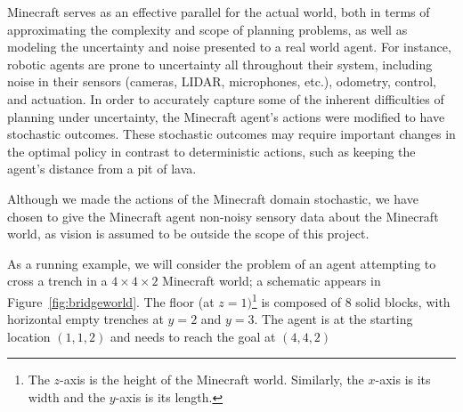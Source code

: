 \documentclass[]{article}
\begin{document}
Minecraft serves as an effective parallel for the actual world, both
in terms of approximating the complexity and scope of planning
problems, as well as modeling the uncertainty and noise presented to a
real world agent.  For instance, robotic agents are prone to
uncertainty all throughout their system, including noise in their
sensors (cameras, LIDAR, microphones, etc.), odometry, control, and
actuation.  In order to accurately capture some of the inherent
difficulties of planning under uncertainty, the Minecraft agent's
actions were modified to have stochastic outcomes. These stochastic
outcomes may require important changes in the optimal policy in
contrast to deterministic actions, such as keeping the agent's
distance from a pit of lava.


 Although we made the actions of the Minecraft domain stochastic, we have chosen to give the Minecraft agent non-noisy sensory
data about the Minecraft world, as vision is assumed to be outside the scope of this
project.


As a running example, we will consider the problem of an agent
attempting to cross a trench in a $4 \times 4 \times 2$ Minecraft
world; a schematic appears in Figure~\ref{fig:bridgeworld}. The floor
(at $z = 1)$\footnote{The $z$-axis is the height of the Minecraft
  world. Similarly, the $x$-axis is its width and the $y$-axis is its
  length.} is composed of 8 solid blocks, with horizontal empty
trenches at $y = 2$ and $y = 3$. The agent is at the starting location
$(1, 1, 2)$ and needs to reach the goal at $(4,4,2)$
\end{document}
